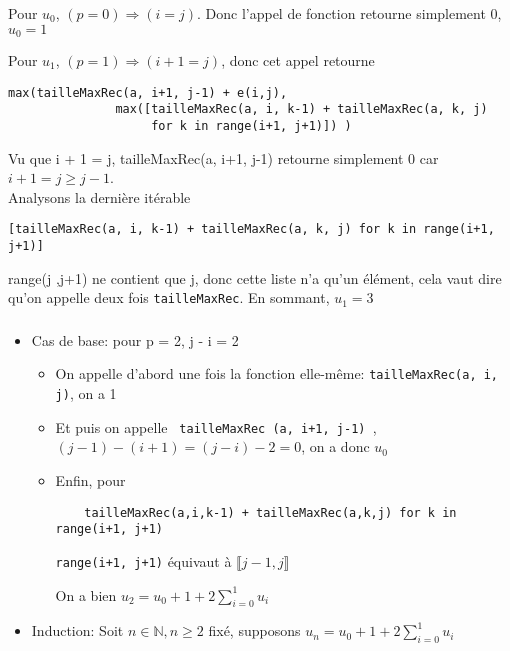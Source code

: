 \documentclass[french]{article}
\begin{document}
\subsubsection{}
Pour $u_{0}$, $(p = 0) \Rightarrow (i = j)$. Donc l'appel de fonction retourne simplement 0, $u_{0}=1$ \par
Pour $u_{1}$, $(p = 1) \Rightarrow (i + 1 = j)$, donc cet appel retourne 
\begin{lstlisting}
max(tailleMaxRec(a, i+1, j-1) + e(i,j),
               max([tailleMaxRec(a, i, k-1) + tailleMaxRec(a, k, j)
                    for k in range(i+1, j+1)]) )\end{lstlisting}
Vu que i + 1 = j,  tailleMaxRec(a, i+1, j-1) retourne simplement 0 car $i+1=j\geq j-1$.\\
Analysons la dernière itérable 
\begin{lstlisting}
[tailleMaxRec(a, i, k-1) + tailleMaxRec(a, k, j) for k in range(i+1, j+1)]\end{lstlisting}
range(j ,j+1) ne contient que j, donc cette liste n'a qu'un élément, cela vaut dire qu'on appelle deux fois  \lstinline{tailleMaxRec}.
En sommant, $u_{1} = 3$
\subsubsection{}
\begin{itemize}
\item
Cas de base: pour p = 2, j - i = 2\\
	\begin{itemize}
	\item
	On appelle d'abord une fois la fonction elle-même: \lstinline{tailleMaxRec(a, i, j)}, on a 1 
	\item
	Et puis on appelle  \lstinline{ tailleMaxRec (a, i+1, j-1) },\\
	 $(j-1)-(i+1)=(j-i)-2=0$, on a donc $u_{0}$ 
	\item
	Enfin, pour \begin{lstlisting}
	tailleMaxRec(a,i,k-1) + tailleMaxRec(a,k,j) for k in range(i+1, j+1)\end{lstlisting}
	\lstinline{range(i+1, j+1)} équivaut à $\llbracket j-1, j \rrbracket$\\
	On a bien  $u_{2} = u_{0} + 1 + 2\sum_{i=0}^{1} u_{i}$
	\end{itemize}
\item 
Induction:
Soit $n \in \mathbb{N}, n\geq2 $ fixé, supposons $u_{n} = u_{0} + 1 + 2\sum_{i=0}^{1} u_{i}$
\end{itemize}
\end{document}
